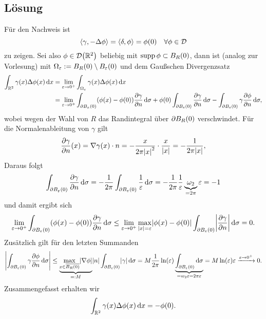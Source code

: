 \documentclass{exercise}
\begin{document}
    \subsection*{Lösung}
    Für den Nachweis ist
    \[
        \angles*{\gamma, -\Delta\phi} = \angles*{\delta, \phi} = \phi\parentheses*{0} \quad \forall \phi \in \mathcal{D}
    \]
    zu zeigen.
    Sei also \(\phi \in \mathcal{D}\parentheses*{\R^2}\) beliebig mit \(\supp\phi \subset B_R\parentheses*{0}\), dann ist (analog zur Vorlesung) mit \(\Omega_\varepsilon := B_R\parentheses*{0} \setminus B_\varepsilon\parentheses*{0}\) und dem Gaußschen Divergenzsatz
    \begin{align*}
        \int_{\R^2}\gamma\parentheses*{x}\Delta\phi\parentheses*{x}\d x &= \lim_{\varepsilon \to 0^+}\int_{\Omega_\varepsilon}\gamma\parentheses*{x}\Delta\phi\parentheses*{x}\d x\\
        &= \lim_{\varepsilon \to 0^+}\int_{\partial B_x\parentheses*{0}}\parentheses*{\phi\parentheses*{x} - \phi\parentheses*{0}}\frac{\partial\gamma}{\partial n}\d\sigma + \phi\parentheses*{0}\int_{\partial B_\varepsilon\parentheses*{0}}\frac{\partial\gamma}{\partial n}\d\sigma - \int_{\partial B_\varepsilon\parentheses*{0}}\gamma\frac{\partial\phi}{\partial n}\d\sigma,
    \end{align*}
    wobei wegen der Wahl von \(R\) das Randintegral über \(\partial B_R\parentheses*{0}\) verschwindet.
    Für die Normalenableitung von \(\gamma\) gilt
    \[
        \frac{\partial\gamma}{\partial n}\parentheses*{x} = \nabla\gamma\parentheses*{x} \cdot n = -\frac{x}{2\pi\absolute*{x}^2} \cdot \frac{x}{\absolute*{x}} = -\frac{1}{2\pi\absolute*{x}},
    \]
    Daraus folgt
    \[
        \int_{\partial B_\varepsilon\parentheses*{0}}\frac{\partial\gamma}{\partial n}\d\sigma = -\frac{1}{2\pi}\int_{\partial B_\varepsilon\parentheses*{0}}\frac{1}{\varepsilon}\d\sigma = -\frac{1}{2\pi}\frac{1}{\varepsilon}\underbrace{\omega_2}_{= 2\pi}\varepsilon = -1
    \]
    und damit ergibt sich
    \[
        \lim_{\varepsilon \to 0^+}\int_{\partial B_\varepsilon\parentheses*{0}}\parentheses*{\phi\parentheses*{x} - \phi\parentheses*{0}}\frac{\partial\gamma}{\partial n}\d\sigma \le \lim_{\varepsilon \to 0^+}\max_{\absolute*{x} = \varepsilon}\absolute*{\phi\parentheses*{x} - \phi\parentheses*{0}}\int_{\partial B_\varepsilon\parentheses*{0}}\absolute*{\frac{\partial\gamma}{\partial n}}\d\sigma = 0.
    \]
    Zusätzlich gilt für den letzten Summanden
    \[
        \absolute*{\int_{\partial B_\varepsilon\parentheses*{0}}\gamma\frac{\partial\phi}{\partial n}\d\sigma} \le \underbrace{\max_{x \in \overline{B_R\parentheses*{0}}}\absolute*{\nabla\phi}}_{=: M}\absolute*{n}\int_{\partial B_\varepsilon\parentheses*{0}}\absolute*{\gamma}\d\sigma = M\frac{1}{2\pi}\ln\parentheses*{\varepsilon}\underbrace{\int_{\partial B_\varepsilon\parentheses*{0}}\d\sigma}_{= w_2 \varepsilon = 2\pi\varepsilon} = M\ln\parentheses*{\varepsilon}\varepsilon \xrightarrow{\varepsilon \to 0^+} 0.
    \]
    Zusammengefasst erhalten wir
    \[
        \int_{\R^2}\gamma\parentheses*{x}\Delta\phi\parentheses*{x}\d x = -\phi\parentheses*{0}.
    \]
\end{document}
